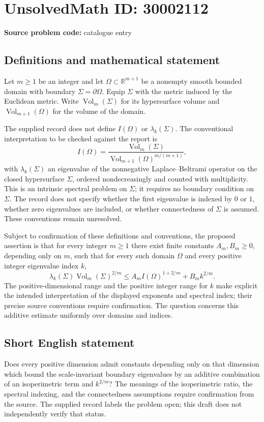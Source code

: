 \documentclass[11pt]{article}
\newcommand{\R}{\mathbb{R}}
\begin{document}
\section*{UnsolvedMath ID: 30002112}
\textbf{Source problem code:} catalogue entry
\subsection{Definitions and mathematical statement}
Let \(m\geq 1\) be an integer and let \(\Omega\subset\R^{m+1}\) be a nonempty smooth bounded domain with boundary \(\Sigma=\partial\Omega\). Equip \(\Sigma\) with the metric induced by the Euclidean metric. Write \(\operatorname{Vol}_m(\Sigma)\) for its hypersurface volume and \(\operatorname{Vol}_{m+1}(\Omega)\) for the volume of the domain.

The supplied record does not define \(I(\Omega)\) or \(\lambda_k(\Sigma)\). The conventional interpretation to be checked against the report is
\[
I(\Omega)=\frac{\operatorname{Vol}_m(\Sigma)}{\operatorname{Vol}_{m+1}(\Omega)^{m/(m+1)}},
\]
with \(\lambda_k(\Sigma)\) an eigenvalue of the nonnegative Laplace--Beltrami operator on the closed hypersurface \(\Sigma\), ordered nondecreasingly and counted with multiplicity. This is an intrinsic spectral problem on \(\Sigma\); it requires no boundary condition on \(\Sigma\). The record does not specify whether the first eigenvalue is indexed by \(0\) or \(1\), whether zero eigenvalues are included, or whether connectedness of \(\Sigma\) is assumed. These conventions remain unresolved.

Subject to confirmation of these definitions and conventions, the proposed assertion is that for every integer \(m\geq1\) there exist finite constants \(A_m,B_m\geq0\), depending only on \(m\), such that for every such domain \(\Omega\) and every positive integer eigenvalue index \(k\),
\[
\lambda_k(\Sigma)\operatorname{Vol}_m(\Sigma)^{2/m}
\leq A_m I(\Omega)^{1+2/m}+B_m k^{2/m}.
\]
The positive-dimensional range and the positive integer range for \(k\) make explicit the intended interpretation of the displayed exponents and spectral index; their precise source conventions require confirmation. The question concerns this additive estimate uniformly over domains and indices.
\subsection{Short English statement}
Does every positive dimension admit constants depending only on that dimension which bound the scale-invariant boundary eigenvalues by an additive combination of an isoperimetric term and \(k^{2/m}\)? The meanings of the isoperimetric ratio, the spectral indexing, and the connectedness assumptions require confirmation from the source. The supplied record labels the problem open; this draft does not independently verify that status.
\end{document}
